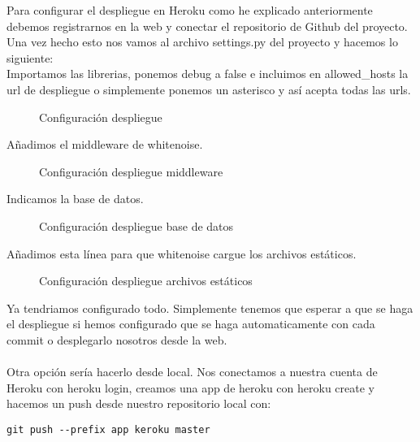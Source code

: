 Para configurar el despliegue en Heroku como he explicado anteriormente debemos registrarnos en la web y conectar el repositorio de Github del proyecto.
Una vez hecho esto nos vamos al archivo settings.py del proyecto y hacemos lo siguiente:\\
Importamos las librerias, ponemos debug a false e incluimos en allowed\_hosts la url de despliegue o simplemente ponemos un asterisco y así acepta todas las urls.

\begin{figure}[H]
  \centering
  \noindent{}
  \caption{Configuración despliegue}
\end{figure}

Añadimos el middleware de whitenoise.

\begin{figure}[H]
  \centering
  \noindent{}
  \caption{Configuración despliegue middleware}
\end{figure}

Indicamos la base de datos.

\begin{figure}[H]
  \centering
  \noindent{}
  \caption{Configuración despliegue base de datos}
\end{figure}

Añadimos esta línea para que whitenoise cargue los archivos estáticos.

\begin{figure}[H]
  \centering
  \noindent{}
  \caption{Configuración despliegue archivos estáticos}
\end{figure}

Ya tendriamos configurado todo. Simplemente tenemos que esperar a que se haga el despliegue si hemos configurado que se haga automaticamente con cada commit o desplegarlo nosotros desde la web.\\\\

Otra opción sería hacerlo desde local.
Nos conectamos a nuestra cuenta de Heroku con heroku login, creamos una app de heroku con heroku create y hacemos un push desde nuestro repositorio local con:
\begin{lstlisting}
git push --prefix app keroku master
\end{lstlisting}

